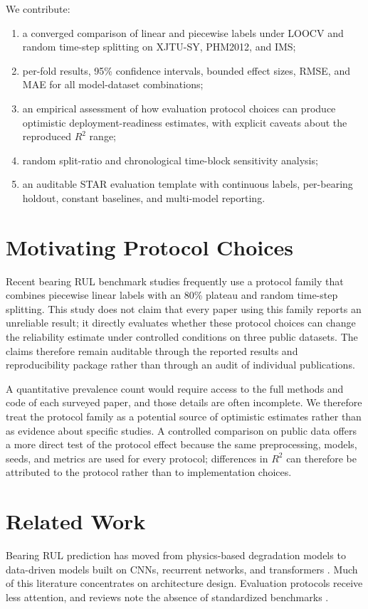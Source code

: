 \documentclass[pdflatex,sn-mathphys-num]{sn-jnl}
\begin{document}
We contribute:
\begin{enumerate}
    \item a converged comparison of linear and piecewise labels under LOOCV and random time-step splitting on XJTU-SY, PHM2012, and IMS;
    \item per-fold results, 95\% confidence intervals, bounded effect sizes, RMSE, and MAE for all model-dataset combinations;
    \item an empirical assessment of how evaluation protocol choices can produce optimistic deployment-readiness estimates, with explicit caveats about the reproduced $R^2$ range;
    \item random split-ratio and chronological time-block sensitivity analysis;
    \item an auditable STAR evaluation template with continuous labels, per-bearing holdout, constant baselines, and multi-model reporting.
\end{enumerate}

\section{Motivating Protocol Choices}
Recent bearing RUL benchmark studies frequently use a protocol family that combines piecewise linear labels with an 80\% plateau and random time-step splitting. This study does not claim that every paper using this family reports an unreliable result; it directly evaluates whether these protocol choices can change the reliability estimate under controlled conditions on three public datasets. The claims therefore remain auditable through the reported results and reproducibility package rather than through an audit of individual publications.

A quantitative prevalence count would require access to the full methods and code of each surveyed paper, and those details are often incomplete. We therefore treat the protocol family as a potential source of optimistic estimates rather than as evidence about specific studies. A controlled comparison on public data offers a more direct test of the protocol effect because the same preprocessing, models, seeds, and metrics are used for every protocol; differences in $R^2$ can therefore be attributed to the protocol rather than to implementation choices.

\section{Related Work}
Bearing RUL prediction has moved from physics-based degradation models to data-driven models built on CNNs, recurrent networks, and transformers \cite{rul_lstm_uq_2022,reg_lstm_2021,transformer_tim_2023}. Much of this literature concentrates on architecture design. Evaluation protocols receive less attention, and reviews note the absence of standardized benchmarks \cite{zhao2021deep,caesarendra2021machine}.
\end{document}
